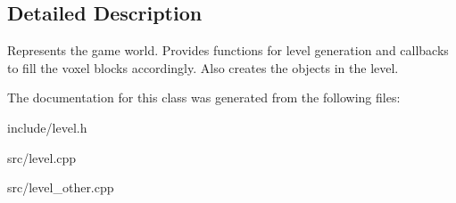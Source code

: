 \subsection{\-Detailed \-Description}
\-Represents the game world. \-Provides functions for level generation and callbacks to fill the voxel blocks accordingly. \-Also creates the objects in the level. 

\-The documentation for this class was generated from the following files\-:\begin{DoxyCompactItemize}
\item 
include/level.\-h\item 
src/level.\-cpp\item 
src/level\-\_\-other.\-cpp\end{DoxyCompactItemize}
